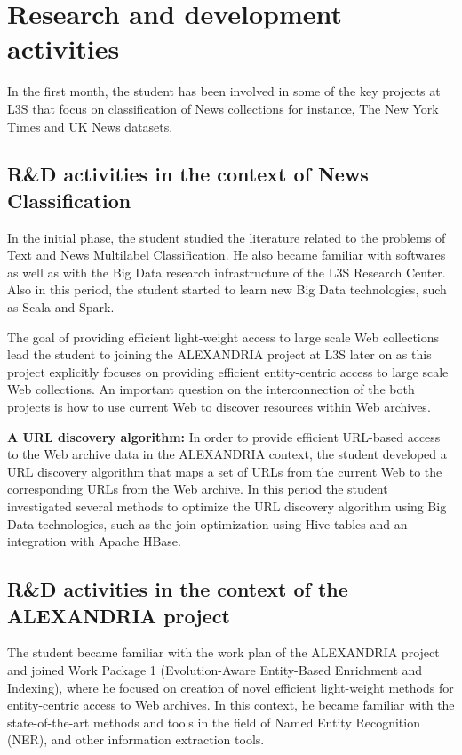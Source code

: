 \documentclass[a4paper,11pt]{report}
\begin{document}
\section{Research and development activities}

In the first month, the student has been involved in some of the key projects
at L3S that focus on classification of News collections for instance, The New
York Times and UK News datasets.

\subsection{R\&D activities in the context of News Classification}
In the initial phase, the student studied the literature related to the 
problems of Text and News Multilabel Classification.
He also became familiar with softwares as well as 
with the Big Data research infrastructure of the L3S Research Center. 
Also in this period, the student started to learn new Big Data technologies, 
such as Scala and Spark. 

%
The goal of providing efficient light-weight access to large scale Web collections
lead the student to joining the ALEXANDRIA project at L3S later on as this project 
explicitly focuses on providing efficient entity-centric access to large scale 
Web collections. 
% 
An important question on the interconnection of the both projects
is how to use current Web to discover resources within Web archives.

\textbf{A URL discovery algorithm:} 
In order to provide efficient URL-based access to the Web archive data in the ALEXANDRIA 
context, the student developed a URL discovery algorithm that
maps a set of URLs from the current Web to the corresponding URLs from the Web archive. 
In this period the student investigated several methods to optimize the URL discovery 
algorithm using Big Data technologies, such as the join optimization using Hive tables and an integration with Apache HBase.

\subsection{R\&D activities in the context of the ALEXANDRIA project}
The student became familiar with the work plan of the ALEXANDRIA project and joined Work Package 
1 (Evolution-Aware Entity-Based Enrichment and Indexing), 
where he focused on creation of novel efficient light-weight methods for 
entity-centric access to Web archives. In this context, he 
became familiar with the state-of-the-art methods and tools in the field of 
Named Entity Recognition (NER), and other information extraction tools. 
\end{document}
